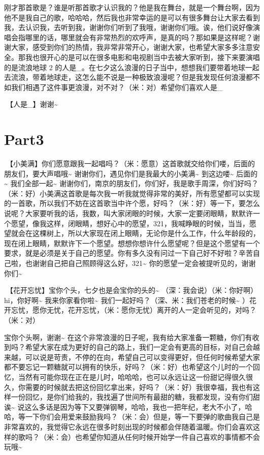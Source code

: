 \documentclass[
]{book}
\begin{document}
刚才那首歌是？谁是听那首歌才认识我的？他是我在舞台，就是一个舞台啊，因为他不是我自己的歌，哈哈哈，然后我也非常幸运的是可以有很多舞台让大家去看到我，去认识我，去听到我，谢谢你们听到了我哦，谢谢你们哦。诶，他们说好像演唱会指哪里的话，哪里就会有非常热烈的欢呼声，是真的吗？那如果是这样呢？谢谢大家，感受到你们的热情，我非常非常开心，谢谢大家，也希望大家多多注意安全。那我也很开心的是可以在很多电影和电视剧当中去被大家听到，接下来要演唱的是流浪地球 2 的人是\_。在七夕这么浪漫的日子当中，想想我们要带着地球一起去流浪，带着地球走，这怎么能不说是一种极致浪漫呢？但是我发现任何浪漫都不如我们相遇了这件事更浪漫，对不对？（米：对）希望你们喜欢人是\_

🎵【人是\_】谢谢\textasciitilde{}

\section{Part3}\label{nanjing-20240810-part3}

🎵【小美满】你们愿意跟我一起唱吗？（米：愿意）这首歌就交给你们喽，后面的朋友们，要大声唱哦\textasciitilde{} 谢谢你们，遇见你们是我最大的小美满\textasciitilde{} 到这边喽\textasciitilde{} 后面的\textasciitilde{} 我们全部一起\textasciitilde{} 谢谢你们，南京的朋友们，你们好，我是歌手周深，你们好吗？（米：好）小美满这首歌是每次我一听我就觉得非常的美好，所有愿望都可以实现的一首歌，所以我们不妨在这首歌当中许个愿，好吗？（米：好）等一下，要怎么说呢？大家要听我的话，我数，叫大家闭眼的时候，大家一定要闭眼睛，默默许一个愿望，像我这样，闭眼睛，想好心中的愿望，321，我喊睁眼的时候，当当，愿望就会在这棵树上，所以大家现在闭上眼睛，无论你是什么工作，什么年龄段的，现在闭上眼睛，默默许下一个愿望。想想你想许什么愿望呢？但是这个愿望有一个要求，就是必须是关于自己的愿望。你有多久没有问过一下自己好不好啦？辛苦自己啦，也谢谢自己把自己照顾得这么好，321\textasciitilde{} 你的愿望一定会被提听见的，谢谢你们\textasciitilde{}

🎵【花开忘忧】宝你个头，七夕也是会宝你的头的\textasciitilde{} （深：我会说）（米：你好啊）hi，你好啊\textasciitilde{} 我来你家看你啦\textasciitilde{} 我们一起好吗？（深、米：我们苍老的时候\textasciitilde{} ）花开忘忧，愿你无忧，花开忘忧，（米：愿你无忧）离开的人一定会听见的，对吗？（米：对）

宝你个头啊，谢谢\textasciitilde{} 在这个非常浪漫的日子呢，我有给大家准备一颗糖，你们有收到吗？希望大家在成为更好的自己的路上，我们一定会有更高的目标，对自己会越来越，可以说是苛责，不停的在向，希望自己可以变得更好，但任何时候希望大家都不要忘记一颗糖就可以拥有的快乐，好吗？（米：好）也希望这个儿时的一个回忆，当然有可能你现在正在是儿时，哈哈哈，也可以永远让这一份甜记得很久很久，你需要的时候就去把这份回忆拿出来，好吗？（米：好）我很幸福，我也有这样一份回忆，是你们给我的，我找遍了世间所有最甜的糖，我都发现，没有你们甜诶\textasciitilde{} 说这么多话是因为等下又要弹钢琴，哈哈，我也一把年纪，老大不小了，哈哈，等一下你们会用爱来鼓励我吗？（米：会）但是，等一下要弹的歌曲我自己是非常喜欢的，我觉得它永远在很多时刻出现的时候都会伴随着温暖。你们会喜欢这样的歌吗？（米：会）也希望你知道从任何时候开始学一件自己喜欢的事情都不会玩哦\textasciitilde{}
\end{document}
